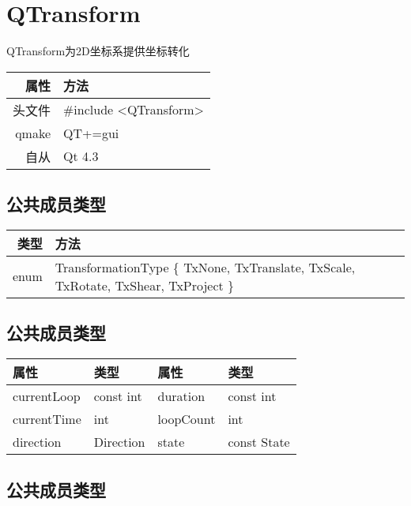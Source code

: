 \chapter{QTransform}

QTransform为2D坐标系提供坐标转化

\begin{tabular}{|r|l|}
	\hline
	属性 & 方法 \\
	\hline
	头文件 & \#include <QTransform>\\      
	\hline
	qmake & QT+=gui\\      
	\hline
	自从 	&Qt 4.3\\ 
	\hline
\end{tabular}

\section{公共成员类型}

\begin{tabular}{|r|m{32em}|}
\hline
类型 &	方法 \\
\hline
enum 	& TransformationType \{ TxNone, TxTranslate, TxScale, TxRotate, TxShear, TxProject \}\\
\hline
\end{tabular}


\section{公共成员类型}

\begin{tabular}{|l|l|l|l|}
\hline
属性 	&类型 	&属性 	&类型 \\ 
\hline
currentLoop &	const int &	duration &	const int \\ 
\hline
currentTime &	int &	loopCount &	int \\ 
\hline
direction &	Direction &	state &	const  State \\ 
\hline
\end{tabular}



\section{公共成员类型}

